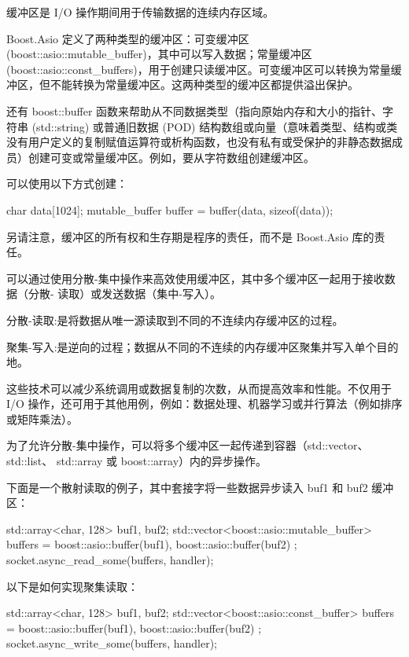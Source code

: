
缓冲区是 I/O 操作期间用于传输数据的连续内存区域。

Boost.Asio 定义了两种类型的缓冲区：可变缓冲区 (boost::asio::mutable\_buffer)，其中可以写入数据；常量缓冲区 (boost::asio::const\_buffers)，用于创建只读缓冲区。可变缓冲区可以转换为常量缓冲区，但不能转换为常量缓冲区。这两种类型的缓冲区都提供溢出保护。

还有 boost::buffer 函数来帮助从不同数据类型（指向原始内存和大小的指针、字符串 (std::string) 或普通旧数据 (POD) 结构数组或向量（意味着类型、结构或类没有用户定义的复制赋值运算符或析构函数，也没有私有或受保护的非静态数据成员）创建可变或常量缓冲区。例如，要从字符数组创建缓冲区。

可以使用以下方式创建：

\begin{cpp}
char data[1024];
mutable_buffer buffer = buffer(data, sizeof(data));
\end{cpp}

另请注意，缓冲区的所有权和生存期是程序的责任，而不是 Boost.Asio 库的责任。


可以通过使用分散-集中操作来高效使用缓冲区，其中多个缓冲区一起用于接收数据（分散- 读取）或发送数据（集中-写入）。

分散-读取:是将数据从唯一源读取到不同的不连续内存缓冲区的过程。

聚集-写入:是逆向的过程；数据从不同的不连续的内存缓冲区聚集并写入单个目的地。

这些技术可以减少系统调用或数据复制的次数，从而提高效率和性能。不仅用于 I/O 操作，还可用于其他用例，例如：数据处理、机器学习或并行算法（例如排序或矩阵乘法）。

为了允许分散-集中操作，可以将多个缓冲区一起传递到容器（std::vector、 std::list、 std::array 或 boost::array）内的异步操作。

下面是一个散射读取的例子，其中套接字将一些数据异步读入 buf1 和 buf2 缓冲区：

\begin{cpp}
std::array<char, 128> buf1, buf2;
std::vector<boost::asio::mutable_buffer> buffers = {
    boost::asio::buffer(buf1),
    boost::asio::buffer(buf2)
};
socket.async_read_some(buffers, handler);
\end{cpp}

以下是如何实现聚集读取：

\begin{cpp}
std::array<char, 128> buf1, buf2;
std::vector<boost::asio::const_buffer> buffers = {
    boost::asio::buffer(buf1),
    boost::asio::buffer(buf2)
};
socket.async_write_some(buffers, handler);
\end{cpp}

